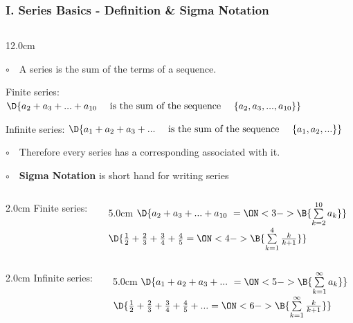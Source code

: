 \begin{frame}
\frametitle{I. Series Basics - Definition \& Sigma Notation}
\scriptsize
\begin{columns}
\begin{column}{12.0cm}

$\circ$ \,\, A series is the sum of the terms of a sequence. \\

\vspace{0.2cm}

\qquad Finite series: \qquad
$\D{a_2+a_3+...+a_{10} \quad \text{ is the sum of the sequence } \quad \{a_2, a_3, ..., a_{10}\}}$

\vspace{0.2cm}

\qquad Infinite series: \qquad
$\D{a_1+a_2+a_3+... \quad \text{ is the sum of the sequence } \quad \{a_1, a_2, ...\}}$

\vspace{0.4cm}

$\circ$ \,\, Therefore every series has a corresponding \quad {} \quad associated with it. 

\vspace{0.4cm}

$\circ$ \,\, {\bf Sigma Notation} is short hand for writing series \\

\vspace{0.4cm}

\begin{columns}
\begin{column}{2.0cm}
	Finite series: \\
	\vspace{1.2cm}
\end{column}
\begin{column}{5.0cm}
	$\D{a_2+a_3+...+a_{10} \,\,= \ON<3->{\B{\sum \limits_{k=2}^{10} a_k}}}$ \\
	\vspace{0.2cm}
	$\D{\frac{1}{2} + \frac{2}{3} + \frac{3}{4} + \frac{4}{5} = \ON<4->{\B{\sum \limits_{k=1}^{4} \frac{k}{k+1}}}}$
\end{column}
\end{columns}

\vspace{0.2cm}

\begin{columns}
\begin{column}{2.0cm}
	Infinite series: \\
	\vspace{1.2cm}
\end{column}
\begin{column}{5.0cm}
	$\D{a_1+a_2+a_3+... \,\,= \ON<5->{\B{\sum \limits_{k=1}^{\infty} a_k}}}$ \\
	\vspace{0.2cm}
	$\D{\frac{1}{2} + \frac{2}{3} + \frac{3}{4} + \frac{4}{5} + ... = \ON<6->{\B{\sum \limits_{k=1}^{\infty} \frac{k}{k+1}}}}$
\end{column}
\end{columns}


\end{column}
\end{columns}
\end{frame}
